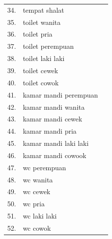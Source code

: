 \begin{enumerate}
\begin{longtable}[c]{|l|l|c|}
34.          & tempat shalat                  &                                          \\ \cline{1-2}
35.          & toilet wanita                  &                                          \\ \cline{1-2}
36.          & toilet pria                    &                                          \\ \cline{1-2}
37.          & toilet perempuan               &                                          \\ \cline{1-2}
38.          & toilet laki laki               &                                          \\ \cline{1-2}
39.          & toilet cewek                   &                                          \\ \cline{1-2}
40.          & toilet cowok                   &                                          \\ \cline{1-2}
41.          & kamar mandi perempuan          &                                          \\ \cline{1-2}
42.          & kamar mandi wanita             &                                          \\ \cline{1-2}
43.          & kamar mandi cewek              &                                          \\ \cline{1-2}
44.          & kamar mandi pria               &                                          \\ \cline{1-2}
45.          & kamar mandi laki laki          &                                          \\ \cline{1-2}
46.          & kamar mandi cowook             &                                          \\ \cline{1-2}
47.          & wc perempuan                   &                                          \\ \cline{1-2}
48.          & wc wanita                      &                                          \\ \cline{1-2}
49.          & wc cewek                       &                                          \\ \cline{1-2}
50.          & wc pria                        &                                          \\ \cline{1-2}
51.          & wc laki laki                   &                                          \\ \cline{1-2}
52.          & wc cowok                       &                                          \\ \cline{1-2}

\end{longtable}
\end{enumerate}
